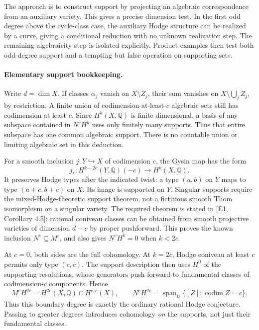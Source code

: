 \documentclass[11pt]{article}
\begin{document}
The approach is to construct support by projecting an algebraic
 correspondence from an auxiliary variety. This gives a precise dimension
 test. In the first odd degree above the cycle-class case, the auxiliary
 Hodge structure can be realized by a curve, giving a conditional reduction
 with no unknown realization step. The remaining algebraicity step is
 isolated explicitly. Product examples then test both odd-degree support
 and a tempting but false operation on supporting sets.

\paragraph{Elementary support bookkeeping.}
Write $d=\dim X$. If classes $\alpha_j$ vanish on $X\setminus Z_j$, their
 sum vanishes on $X\setminus\bigcup_j Z_j$, by restriction. A finite union
 of codimension-at-least-$c$ algebraic sets still has codimension at least
 $c$. Since $H^k(X,\mathbb Q)$ is finite dimensional, a basis of any
 subspace contained in $N^cH^k$ uses only finitely many supports. Thus that
 entire subspace has one common algebraic support. There is no countable
 union or limiting algebraic set in this deduction.

For a smooth inclusion $j:Y\hookrightarrow X$ of codimension $c$, the
 Gysin map has the form
\[
 j_*:H^{k-2c}(Y,\mathbb Q)(-c)\longrightarrow H^k(X,\mathbb Q).
\]
It preserves Hodge types after the indicated twist: a type $(a,b)$ on
 $Y$ maps to type $(a+c,b+c)$ on $X$. Its image is supported on $Y$.
 Singular supports require the mixed-Hodge-theoretic support theorem,
 not a fictitious smooth Thom isomorphism on a singular variety.
 The required theorem is stated in [E1, Corollary 4.5]: rational coniveau
 classes can be obtained from smooth projective varieties of dimension
 $d-c$ by proper pushforward. This proves the known inclusion $N^c\subseteq
 M^c$, and also gives $N^cH^k=0$ when $k<2c$.

At $c=0$, both sides are the full cohomology. At $k=2c$, Hodge coniveau
 at least $c$ permits only type $(c,c)$. The support description then
 uses $H^0$ of the supporting resolutions, whose generators push forward
 to fundamental classes of codimension-$c$ components. Hence
\begin{equation}\label{ghc:even}
 M^cH^{2c}=H^{2c}(X,\mathbb Q)\cap H^{c,c}(X),\qquad
 N^cH^{2c}=\operatorname{span}_{\mathbb Q}\{[Z]:\operatorname{codim}Z=c\}.
\end{equation}
Thus this boundary degree is exactly the ordinary rational Hodge
 conjecture. Passing to greater degrees introduces cohomology \emph{on}
 the supports, not just their fundamental classes.
\end{document}

